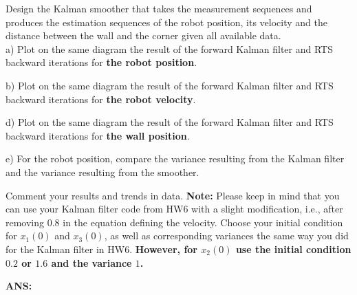 \documentclass{article}
\begin{document}
Design the Kalman smoother that takes the measurement sequences and
produces the estimation sequences of the robot position, its velocity and the
distance between the wall and the corner given all available data. \\

a) Plot on the same diagram the result of the forward Kalman filter and
RTS backward iterations for {\bf the robot position}.

b) Plot on the same diagram the result of the forward Kalman filter and
RTS backward iterations for {\bf the robot velocity}.

d) Plot on the same diagram the result of the forward Kalman filter and
RTS backward iterations for {\bf the wall position}.

e) For the robot position, compare the variance resulting from the Kalman
filter and the variance resulting from the smoother.

Comment your results and trends in data. {\bf Note:} Please keep in mind that
you can use your Kalman filter code from HW6 with a slight modification, i.e.,
after removing 0.8 in the equation defining the velocity. Choose your initial
condition for $x_1(0)$ and $x_3(0)$, as well as corresponding variances the 
same way you did for the Kalman filter in HW6. {\bf However, for $x_2(0)$ use the 
initial condition $0.2$ or $1.6$ and the variance $1$.}

\textbf{ANS:}\\
\end{document}
